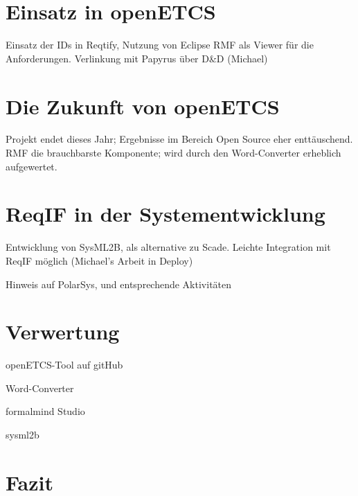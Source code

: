 \documentclass[twoside]{article}
\begin{document}
\begin{multicols}{2}
\section{Einsatz in openETCS}

Einsatz der IDs in Reqtify, Nutzung von Eclipse RMF als Viewer für die Anforderungen. Verlinkung mit Papyrus über D\&D (Michael)

\section{Die Zukunft von openETCS}

Projekt endet dieses Jahr; Ergebnisse im Bereich Open Source eher enttäuschend. RMF die brauchbarste Komponente; wird durch den Word-Converter erheblich aufgewertet.

\section{ReqIF in der Systementwicklung}

Entwicklung von SysML2B, als alternative zu Scade.  Leichte Integration mit ReqIF möglich (Michael's Arbeit in Deploy)

Hinweis auf PolarSys, und entsprechende Aktivitäten

\section{Verwertung}

openETCS-Tool auf gitHub

Word-Converter

formalmind Studio

sysml2b

\section{Fazit}


\end{multicols}

\titleformat{\section}[block]{\large\scshape\centering{}}{}{1em}{}



\end{document}
